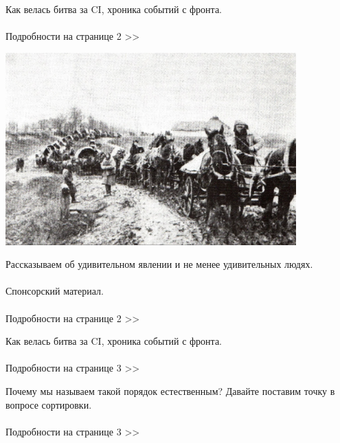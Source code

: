 \documentclass{article}
\date{\today}
\begin{document}
\maketitle

\begin{multicols}{3}

Как велась битва за CI, хроника событий с фронта.
\\\\Подробности на странице 2 >>
\vspace{10mm}
\closearticle

\includegraphics[width=11.2cm]{image.png}

\end{multicols}

\begin{multicols}{3}

Рассказываем об удивительном явлении и не менее удивительных людях.\\\\
Спонсорский материал.
\\\\Подробности на странице 2 >>
\vspace{8mm}
\closearticle

Как велась битва за CI, хроника событий с фронта.
\\\\Подробности на странице 3 >>
\vspace{8mm}
\closearticle

Почему мы называем такой порядок естественным? Давайте поставим точку в вопросе сортировки.
\\\\Подробности на странице 3 >>
\closearticle

\end{multicols}
\end{document}

